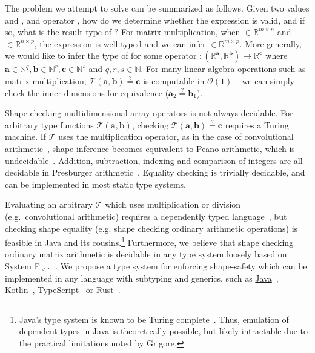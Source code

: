 The problem we attempt to solve can be summarized as follows. Given two values  and , and operator \inline{\$}, how do we determine whether the expression  is valid, and if so, what is the result type of ? For matrix multiplication, when  $\in \mathbb{R}^{m \times n}$ and  $\in \mathbb{R}^{n \times p}$, the expression is well-typed and we can infer  $\in \mathbb{R}^{m \times p}$. More generally, we would like to infer the type of  for some operator  $: (\mathbb{R}^\mathbf{a}, \mathbb{R}^\mathbf{b}) \rightarrow \mathbb{R}^\mathbf{c}$ where $\mathbf{a} \in \mathbb{N}^q, \mathbf{b} \in \mathbb{N}^r, \mathbf{c} \in \mathbb{N}^s$ and $q, r, s \in \mathbb{N}$. For many linear algebra operations such as matrix multiplication, $\mathcal{T}(\mathbf a, \mathbf b) \stackrel{?}{=} \mathbf c$ is computable in $\mathcal{O}(1)$ -- we can simply check the inner dimensions for equivalence ($\mathbf{a}_2 \stackrel{?}{=} \mathbf{b}_1$).

Shape checking multidimensional array operators is not always decidable. For arbitrary type functions $\mathcal{T}(\mathbf{a}, \mathbf{b})$, checking $\mathcal{T}(\mathbf{a}, \mathbf{b}) \stackrel{?}{=} \mathbf{c}$ requires a Turing machine. If $\mathcal{T}$ uses the multiplication operator, as in the case of convolutional arithmetic~\citep{dumoulin2016guide}, shape inference becomes equivalent to Peano arithmetic, which is undecidable~\citep{godel1931formal}. Addition, subtraction, indexing and comparison of integers are all decidable in Presburger arithmetic~\citep{suzuki1980verification, bradley2006decidable, charlier2011enumeration}. Equality checking is trivially decidable, and can be implemented in most static type systems.

Evaluating an arbitrary $\mathcal{T}$ which uses multiplication or division (e.g.\ convolutional arithmetic) requires a dependently typed language~\citep{xi1998eliminating, pineyro2019structure}, but checking shape equality (e.g. shape checking ordinary arithmetic operations) is feasible in Java and its cousins.\hspace{-.08em}\footnote{Java's type system is known to be Turing complete~\citep{grigore2017java}. Thus, emulation of dependent types in Java is theoretically possible, but likely intractable due to the practical limitations noted by Grigore.} Furthermore, we believe that shape checking ordinary matrix arithmetic is decidable in any type system loosely based on System F${}_{<:}$~\citep{cardelli1991extension}. We propose a type system for enforcing shape-safety which can be implemented in any language with subtyping and generics, such as \href{https://docs.oracle.com/javase/tutorial/java/generics/index.html}{Java}~\citep{naftalin2007java}, \href{https://kotlinlang.org/docs/reference/generics.html}{Kotlin}~\citep{tate2013mixed}, \href{https://www.typescriptlang.org/docs/handbook/advanced-types.html}{TypeScript}~\citep{bierman2014understanding} or \href{https://doc.rust-lang.org/1.7.0/book/generics.html}{Rust}~\citep{crozet2019nalgebra}.

